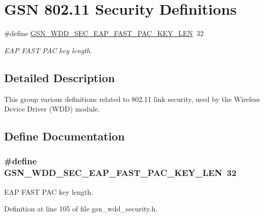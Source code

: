 \hypertarget{a00678}{
\section{GSN 802.11 Security Definitions}
\label{a00678}
}
\begin{DoxyCompactItemize}
\item 
\#define \hyperlink{a00678_gabd73b0f9f75c95ccd502804aaf00897f}{GSN\_\-WDD\_\-SEC\_\-EAP\_\-FAST\_\-PAC\_\-KEY\_\-LEN}~32
\begin{DoxyCompactList}\small\item\em EAP FAST PAC key length. \end{DoxyCompactList}\end{DoxyCompactItemize}


\subsection{Detailed Description}
This group various definitions related to 802.11 link security, used by the Wireless Device Driver (WDD) module. 

\subsection{Define Documentation}
\hypertarget{a00678_gabd73b0f9f75c95ccd502804aaf00897f}{
\subsubsection[{GSN\_\-WDD\_\-SEC\_\-EAP\_\-FAST\_\-PAC\_\-KEY\_\-LEN}]{\setlength{\rightskip}{0pt plus 5cm}\#define GSN\_\-WDD\_\-SEC\_\-EAP\_\-FAST\_\-PAC\_\-KEY\_\-LEN~32}}
\label{a00678_gabd73b0f9f75c95ccd502804aaf00897f}


EAP FAST PAC key length. 



Definition at line 105 of file gsn\_\-wdd\_\-security.h.

